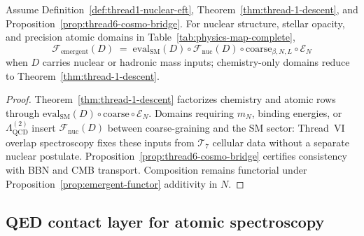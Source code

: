 \begin{proposition}
\label{prop:thread1-nuclear-descent}
Assume Definition~\ref{def:thread1-nuclear-eft},
Theorem~\ref{thm:thread-1-descent}, and
Proposition~\ref{prop:thread6-cosmo-bridge}. For nuclear structure,
stellar opacity, and precision atomic domains in
Table~\ref{tab:physics-map-complete},
\begin{equation}\label{eq:thread1-nuclear-factorization}
  \mathcal{F}_{\mathrm{emergent}}(D)
  \;=\;
  \mathrm{eval}_{\mathrm{SM}}(D)
  \circ
  \mathcal{F}_{\mathrm{nuc}}(D)
  \circ
  \mathrm{coarse}_{\beta,N,L}
  \circ
  \mathcal{E}_N
\end{equation}
when $D$ carries nuclear or hadronic mass inputs; chemistry-only domains
reduce to Theorem~\ref{thm:thread-1-descent}.
\end{proposition}

\begin{proof}
Theorem~\ref{thm:thread-1-descent} factorizes chemistry and atomic rows through
$\mathrm{eval}_{\mathrm{SM}}(D)\circ\mathrm{coarse}\circ\mathcal{E}_N$.
Domains requiring $m_N$, binding energies, or $\Lambda_{\mathrm{QCD}}^{(2)}$
insert $\mathcal{F}_{\mathrm{nuc}}(D)$ between coarse-graining and the SM
sector: Thread~VI overlap spectroscopy fixes these inputs from
$\mathcal{T}_7$ cellular data without a separate nuclear postulate.
Proposition~\ref{prop:thread6-cosmo-bridge} certifies consistency with BBN and
CMB transport. Composition remains functorial under
Proposition~\ref{prop:emergent-functor} additivity in $N$.
\end{proof}

\subsection{QED contact layer for atomic spectroscopy}
\label{sec:wave4-thread1:qed}

